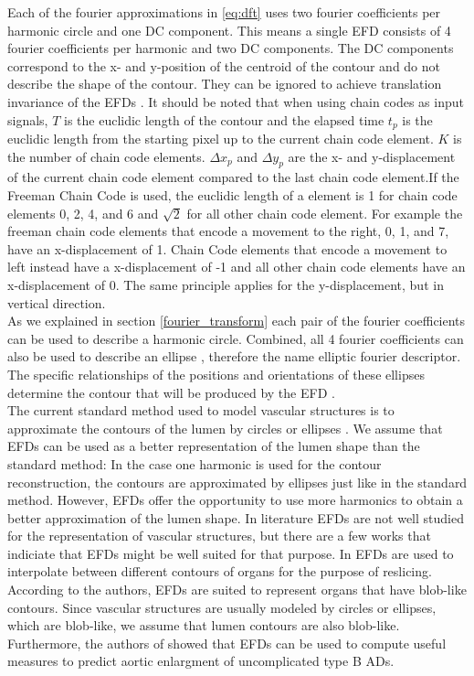 \documentclass[thesis.tex]{subfiles}
\begin{document}
Each of the fourier approximations in \ref{eq:dft} uses two fourier coefficients per harmonic circle and one DC component. This means a single EFD consists of 4 fourier coefficients per harmonic and two DC components. The DC components correspond to the x- and y-position of the centroid of the contour and do not describe the shape of the contour. They can be ignored to achieve translation invariance of the EFDs \cite{giardinia}. It should be noted that when using chain codes as input signals, $T$ is the euclidic length of the contour and the elapsed time $t_p$ is the euclidic length from the starting pixel up to the current chain code element. $K$ is the number of chain code elements. $\Delta x_p$ and $\Delta y_p$ are the x- and y-displacement of the current chain code element compared to the last chain code element.If the Freeman Chain Code is used, the euclidic length of a element is 1 for chain code elements 0, 2, 4, and 6 and $\sqrt{2}$ for all other chain code element.  For example the freeman chain code elements that encode a movement to the right, 0, 1, and 7, have an x-displacement of 1. Chain Code elements that encode a movement to left instead have a x-displacement of -1 and all other chain code elements have an x-displacement of 0. The same principle applies for the y-displacement, but in vertical direction. \\ As we explained in section \ref{fourier_transform} each pair of the fourier coefficients can be used to describe a harmonic circle. Combined, all 4 fourier coefficients can also be used to describe an ellipse \cite{lin1987new,giardinia}, therefore the name elliptic fourier descriptor. The specific relationships of the positions and orientations of these ellipses determine the contour that will be produced by the EFD \cite{lin1987new}. \\
The current standard method used to model vascular structures is to approximate the contours of the lumen by circles or ellipses \cite{wu2011segmentation}. We assume that EFDs can be used as a better representation of the lumen shape than the standard method: In the case one harmonic is used for the contour reconstruction, the contours are approximated by ellipses just like in the standard method. However, EFDs offer the opportunity to use more harmonics to obtain a better approximation of the lumen shape. In literature EFDs are not well studied for the representation of vascular structures, but there are a few works that indiciate that EFDs might be well suited for that purpose. In \cite{jeong2007reslicing} EFDs are used to interpolate between different contours of organs for the purpose of reslicing. According to the authors, EFDs are suited to represent organs that have blob-like contours. Since vascular structures are usually modeled by circles or ellipses, which are blob-like, we assume that lumen contours are also blob-like. Furthermore, the authors of \cite{sato2017new} showed that EFDs can be used to compute useful measures to predict aortic enlargment of uncomplicated type B ADs. \\      
\end{document}
